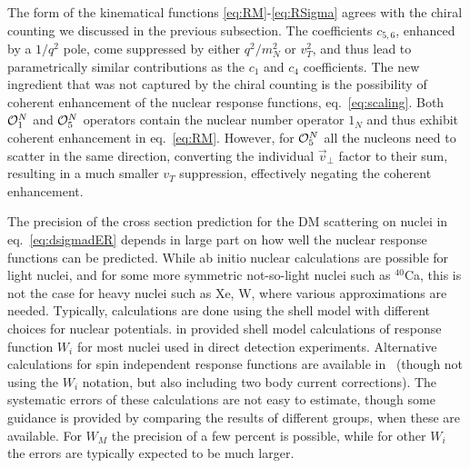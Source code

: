 \smallskip

The form of the kinematical functions \eqref{eq:RM}-\eqref{eq:RSigma} agrees with the chiral counting we discussed in the previous subsection. 
The coefficients $c_{5,6}$, enhanced by a $1/{q}^2$ pole, 
come suppressed by either ${q}^2/m_N^2$ or $v_T^2$, 
and thus lead to parametrically similar contributions as the $c_1$ and $c_4$ coefficients. 
The new ingredient that was not captured by the chiral counting is the possibility of coherent enhancement of the nuclear response functions, eq.~\eqref{eq:scaling}. Both ${\cal O}_1^N$ and ${\cal O}_5^N$ operators contain the nuclear number operator $1_N$ and thus exhibit coherent enhancement in eq.~\eqref{eq:RM}. 
However, for ${\cal O}_5^N$ all the nucleons need to scatter in the same direction, converting the individual $\vec v_\perp$ factor to their sum, resulting in a much smaller $v_T$ suppression, effectively negating the coherent enhancement. 

\smallskip

The precision of the cross section prediction for the DM scattering on nuclei  in eq.~\eqref{eq:dsigmadER} depends in large part on  how well the nuclear response functions can be predicted. 
While ab initio nuclear calculations are possible for light nuclei, 
and for some more symmetric not-so-light nuclei such as $^{40}$Ca, 
this is not the case for heavy nuclei such as Xe, W, where various approximations are needed. 
Typically, calculations are done using the shell model with different choices for nuclear potentials.   in \cite{Anand:2013yka} provided shell model calculations of response function $W_i$ for most nuclei used in direct detection experiments. Alternative calculations for spin independent response functions are available in~\cite{Hoferichter:2018acd} (though not using the $W_i$ notation, but also including two body current corrections). The systematic errors of these calculations are  not easy to estimate, though some guidance is provided by comparing the results of different groups, when these are available. For $W_M$ the precision of a few percent is possible, while for other $W_i$ the errors are typically expected to be much larger. 


